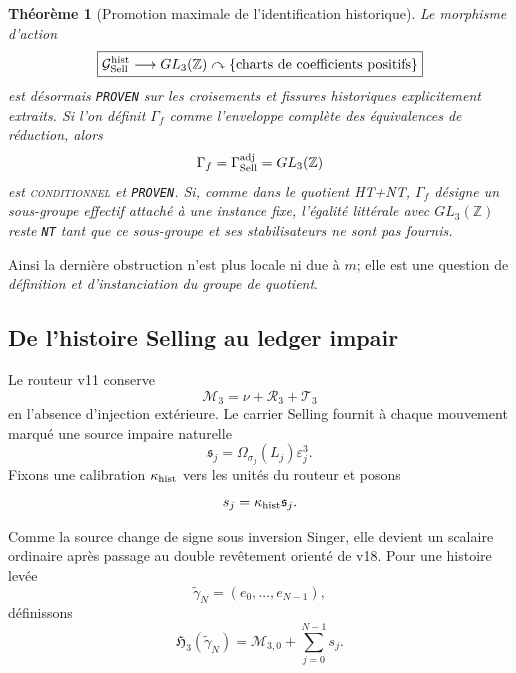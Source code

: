 \documentclass[11pt,a4paper]{article}
\newtheorem{theorem}{Théorème}[section]
\newcommand{\statusCond}{\textsc{conditionnel}}
\newcommand{\certProven}{\texttt{PROVEN}}
\newcommand{\certNT}{\texttt{NT}}
\begin{document}
\begin{theorem}[Promotion maximale de l'identification historique]\label{thm:v26-Gamma-status}
Le morphisme d'action
\[
 \boxed{
 \mathcal G_{\rm Sell}^{\rm hist}
 \longrightarrow
 GL_3(\mathbb Z)\curvearrowright
 \{\text{charts de coefficients positifs}\}}
\]
est désormais \certProven{} sur les croisements et fissures historiques explicitement extraits. Si l'on \emph{définit} $\Gamma_f$ comme l'enveloppe complète des équivalences de réduction, alors
\[
 \Gamma_f=\Gamma_{\rm Sell}^{\rm adj}=GL_3(\mathbb Z)
\]
est \statusCond{} et \certProven{}. Si, comme dans le quotient HT+NT, $\Gamma_f$ désigne un sous-groupe effectif attaché à une instance fixe, l'égalité littérale avec $GL_3(\mathbb Z)$ reste \certNT{} tant que ce sous-groupe et ses stabilisateurs ne sont pas fournis.
\end{theorem}

Ainsi la dernière obstruction n'est plus locale ni due à $m$; elle est une question de \emph{définition et d'instanciation du groupe de quotient}.

\subsection{De l'histoire Selling au ledger impair}

Le routeur v11 conserve
\[
 \mathcal M_3
 =
 \nu+\mathscr R_3+\mathscr T_3
\]
en l'absence d'injection extérieure. Le carrier Selling fournit à chaque mouvement marqué une source impaire naturelle
\[
 \mathfrak s_j
 =
 \Omega_{\sigma_j}(L_j)\varepsilon_j^3.
\]
Fixons une calibration $\kappa_{\rm hist}$ vers les unités du routeur et posons
\[
 s_j=\kappa_{\rm hist}\mathfrak s_j.
\]

Comme la source change de signe sous inversion Singer, elle devient un scalaire ordinaire après passage au double revêtement orienté de v18. Pour une histoire levée
\[
 \widetilde\gamma_N=(e_0,\ldots,e_{N-1}),
\]
définissons
\begin{equation}\label{eq:v26-history-ledger}
 \boxed{
 \mathfrak H_3(\widetilde\gamma_N)
 =
 \mathcal M_{3,0}
 +
 \sum_{j=0}^{N-1}s_j.}
\end{equation}
\end{document}
